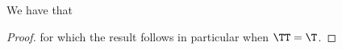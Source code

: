 \begin{proposition}
  \nrp
  We have that %
\end{proposition}

\begin{proof}
  \nrp
  \nrp
  for which the result follows in particular when $\TT = \T$.
\end{proof}
